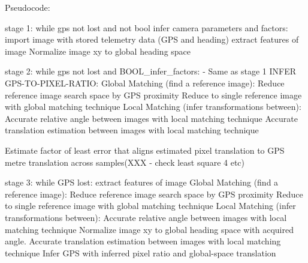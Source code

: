 Pseudocode:

stage 1: 
while gps not lost and not bool infer camera parameters and factors:
import image with stored telemetry data (GPS and heading)
extract features of image
Normalize image xy to global heading space


stage 2:
while gps not lost and BOOL_infer_factors:
- Same as stage 1
INFER GPS-TO-PIXEL-RATIO:
    Global Matching (find a reference image):
        Reduce reference image search space by GPS proximity  
        Reduce to single reference image with global matching technique
    Local Matching (infer transformations between):
        Accurate relative angle between images with local matching technique
        Accurate translation estimation between images with local matching technique

Estimate factor of least error that aligns estimated pixel translation to GPS metre translation across samples(XXX - check least square 4 etc)

stage 3:
while GPS lost:
extract features of image
Global Matching (find a reference image):
    Reduce reference image search space by GPS proximity  
    Reduce to single reference image with global matching technique
Local Matching (infer transformations between):
    Accurate relative angle between images with local matching technique
    Normalize image xy to global heading space with acquired angle. 
    Accurate translation estimation between images with local matching technique
    Infer GPS with inferred pixel ratio and global-space translation

